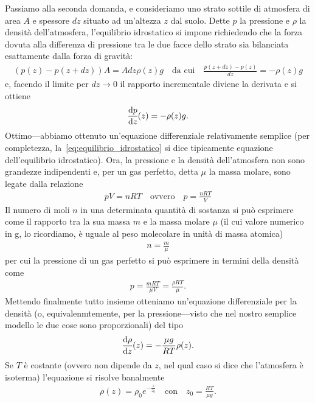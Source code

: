 Passiamo alla seconda domanda, e consideriamo uno strato sottile di atmosfera di
area $A$ e spessore $dz$ situato ad un'altezza $z$ dal suolo. Dette $p$ la
pressione e $\rho$ la densità dell'atmosfera, l'equilibrio idrostatico si impone
richiedendo che la forza dovuta alla differenza di pressione tra le due facce dello
strato sia bilanciata esattamente dalla forza di gravità:
\begin{align*}
  \left(p(z) - p(z + dz)\right) A = A dz \rho(z) g \quad \text{da cui} \quad
  \frac{p(z + dz) - p(z)}{dz} = -\rho(z) g
\end{align*}
e, facendo il limite per $dz \rightarrow 0$ il rapporto incrementale diviene la
derivata e si ottiene
\begin{align}\label{eq:equilibrio_idrostatico}
  \td{p}{z}{z} = -\rho(z) g.
\end{align}
Ottimo---abbiamo ottenuto un'equazione differenziale relativamente semplice
(per completezza, la~\eqref{eq:equilibrio_idrostatico} si dice tipicamente
equazione dell'equilibrio idrostatico).
Ora, la pressione e la densità dell'atmosfera non sono grandezze indipendenti e,
per un gas perfetto, detta $\mu$ la massa molare, sono legate dalla relazione
\begin{align*}
  pV = n R T \quad \text{ovvero} \quad p = \frac{n R T}{V}
\end{align*}
Il numero di moli $n$ in una determinata quantità di sostanza si può esprimere
come il rapporto tra la sua massa $m$ e la massa molare $\mu$ (il cui valore numerico
in g, lo ricordiamo, è uguale al peso molecolare in unità di massa atomica)
\begin{align*}
  n = \frac{m}{\mu}
\end{align*}
per cui la pressione di un gas perfetto si può esprimere in termini della
densità come
\begin{align*}
  p = \frac{m R T}{\mu V} = \frac{\rho RT}{\mu}.
\end{align*}
Mettendo finalmente tutto insieme otteniamo un'equazione differenziale per la
densità (o, equivalenmtemente, per la pressione---visto che nel nostro semplice
modello le due cose sono proporzionali) del tipo
\begin{align}
  \td{\rho}{z}{z} = -\frac{\mu g}{R T} \rho(z).
\end{align}
Se $T$ è costante (ovvero non dipende da $z$, nel qual caso si dice che
l'atmosfera è isoterma) l'equazione si risolve banalmente
\begin{align}
  \rho(z) = \rho_0 e^{-\frac{z}{z_0}} \quad \text{con} \quad z_0 = \frac{R T}{\mu g}.
\end{align}
